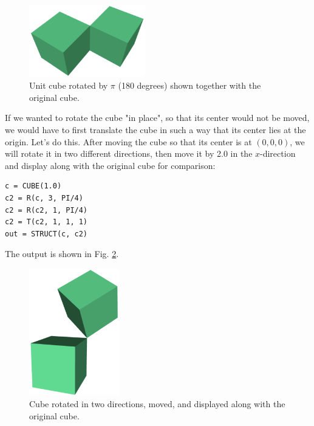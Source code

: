\begin{figure}[!ht]
\begin{center}
\includegraphics[width=0.45\textwidth]{img/rot-1.png}
\end{center}
\vspace{-4mm}
\caption{Unit cube rotated by $\pi$ (180 degrees) shown together with the original cube.}
\label{fig:rot-1}
\end{figure}
\noindent
If we wanted to 
rotate the cube "in place", so that its center would not be moved,
we would have to first translate the cube in such a way that its center
lies at the origin. Let's do this. After moving the cube so that 
its center is at $(0, 0, 0)$, we will rotate it in two different directions,
then move it by 2.0 in the $x$-direction and display along with 
the original cube for comparison:\\

\begin{bbox}
\begin{verbatim}
c = CUBE(1.0)
c2 = R(c, 3, PI/4)
c2 = R(c2, 1, PI/4)
c2 = T(c2, 1, 1, 1)
out = STRUCT(c, c2)
\end{verbatim}
\end{bbox}
\vspace{6mm}

\noindent
The output is shown in Fig. \ref{fig:rot-2}.
\newpage

\begin{figure}[!ht]
\begin{center}
\includegraphics[width=0.35\textwidth]{img/rot-2.png}
\end{center}
\vspace{-4mm}
\caption{Cube rotated in two directions, moved, and displayed along with the original cube.}
\label{fig:rot-2}
\end{figure}

